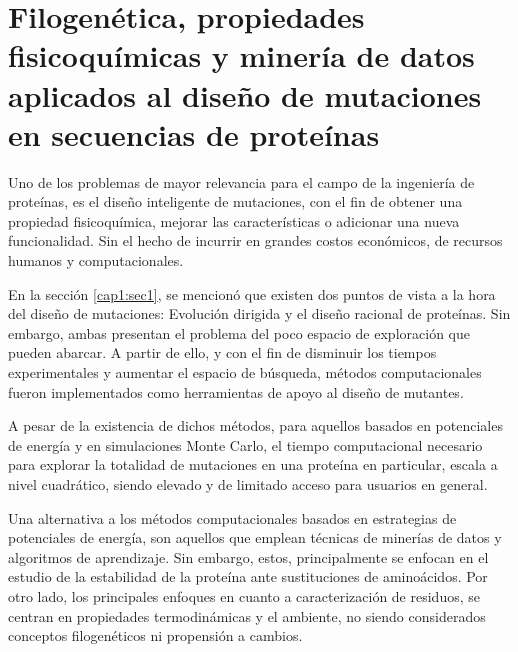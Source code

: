\chapter{Filogenética, propiedades fisicoquímicas y minería de datos aplicados al diseño de mutaciones en secuencias de proteínas \label{cap4}}

\ifpdf
    \graphicspath{{Chapter4/Figs/Raster/}{Chapter4/Figs/PDF/}{Chapter4/Figs/}}
\else
    \graphicspath{{Chapter4/Figs/Vector/}{Chapter4/Figs/}}
\fi

Uno de los problemas de mayor relevancia para el campo de la ingeniería de proteínas, es el diseño inteligente de mutaciones, con el fin de obtener una propiedad fisicoquímica, mejorar las características o adicionar una nueva funcionalidad. Sin el hecho de incurrir en grandes costos económicos, de recursos humanos y computacionales.

En la sección \ref{cap1:sec1}, se mencionó que existen dos puntos de vista a la hora del diseño de mutaciones: Evolución dirigida y el diseño racional de proteínas. Sin embargo, ambas presentan el problema del poco espacio de exploración que pueden abarcar. A partir de ello, y con el fin de disminuir los tiempos experimentales y aumentar el espacio de búsqueda, métodos computacionales fueron implementados como herramientas de apoyo al diseño de mutantes. 

A pesar de la existencia de dichos métodos, para aquellos basados en potenciales de energía y en simulaciones Monte Carlo, el tiempo computacional necesario para explorar la totalidad de mutaciones en una proteína en particular, escala a nivel cuadrático, siendo elevado y de limitado acceso para usuarios en general.

Una alternativa a los métodos computacionales basados en estrategias de potenciales de energía, son aquellos que emplean técnicas de minerías de datos y algoritmos de aprendizaje. Sin embargo, estos, principalmente se enfocan en el estudio de la estabilidad de la proteína ante sustituciones de aminoácidos. Por otro lado, los principales enfoques en cuanto a caracterización de residuos, se centran en propiedades termodinámicas y el ambiente, no siendo considerados conceptos filogenéticos ni propensión a cambios. 

